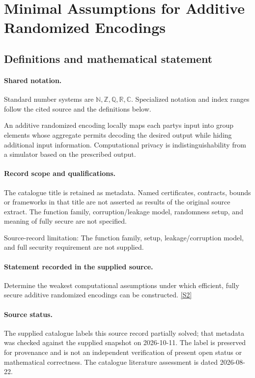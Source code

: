 \documentclass[11pt]{article}
\newcommand{\sref}[2]{\hyperlink{source:#1:#2}{[S#2]}}
\begin{document}
\section{Minimal Assumptions for Additive Randomized Encodings}\label{statement}

\subsection{Definitions and mathematical statement}

\paragraph{Shared notation.}Standard number systems are $\mathbb N,\mathbb Z,\mathbb Q,\mathbb R,\mathbb C$. Specialized notation and index ranges follow the cited source and the definitions below.


An additive randomized encoding locally maps each party\textquotesingle s input into group elements whose aggregate permits decoding the desired output while hiding additional input information. Computational privacy is indistinguishability from a simulator based on the prescribed output.
\paragraph{Record scope and qualifications.}
The catalogue title is retained as metadata. Named certificates, contracts, bounds or frameworks in that title are not asserted as results of the original source extract.
The function family, corruption/leakage model, randomness setup, and meaning of fully secure are not specified.

Source-record limitation: The function family, setup, leakage/corruption model, and full security requirement are not supplied.
\paragraph{Statement recorded in the supplied source.}
Determine the weakest computational assumptions under which efficient, fully secure additive randomized encodings can be constructed. \sref{statement}{2}
\paragraph{Source status.}
The supplied catalogue labels this source record partially solved; that metadata was checked against the supplied snapshot on 2026-10-11. The label is preserved for provenance and is not an independent verification of present open status or mathematical correctness. The catalogue literature assessment is dated 2026-08-22.
\end{document}
